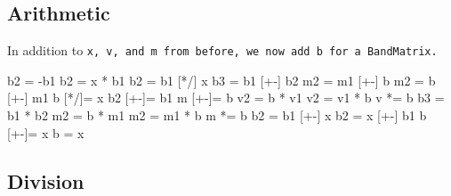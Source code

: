 \subsection{Arithmetic}
\label{BandMatrix_Arithmetic}

In addition to \tt{x}, \tt{v}, and \tt{m} from before, we now add \tt{b} 
for a \tt{BandMatrix}.

\begin{tmvcode}
b2 = -b1
b2 = x * b1
b2 = b1 [*/] x
b3 = b1 [+-] b2
m2 = m1 [+-] b
m2 = b [+-] m1
b [*/]= x
b2 [+-]= b1
m [+-]= b
v2 = b * v1
v2 = v1 * b
v *= b
b3 = b1 * b2
m2 = b * m1
m2 = m1 * b
m *= b
b2 = b1 [+-] x
b2 = x [+-] b1
b [+-]= x
b = x
\end{tmvcode}

\subsection{Division}
\label{BandMatrix_Division}

